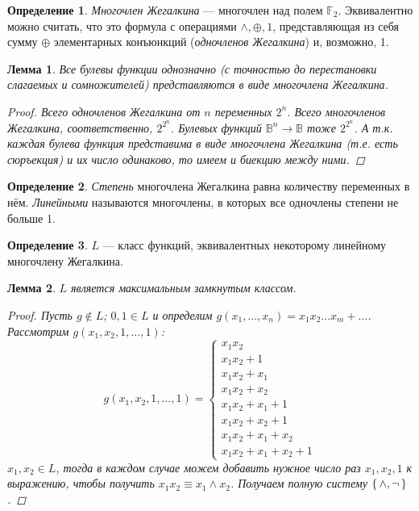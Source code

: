 \documentclass[12pt]{article}
\let\eq\equiv
\let\la\land
\let\n\neg
\let\nin\notin
\theoremstyle{definition}
\newtheorem{definition}{Определение}[section]
\theoremstyle{plain}
\newtheorem{lemma}{Лемма}[section]
\theoremstyle{remark}
\begin{document}
\begin{definition}
  \textit{Многочлен Жегалкина} --- многочлен над полем
  $\mathbb{F}_2$. Эквивалентно можно считать, что это формула с
  операциями $\la, \oplus, 1$, представляющая из себя сумму $\oplus$
  элементарных конъюнкций (\textit{одночленов Жегалкина}) и, возможно, 1.
\end{definition}

\begin{lemma}
  Все булевы функции однозначно (с точностью до перестановки
  слагаемых и сомножителей) представляются в виде многочлена Жегалкина.
  \begin{proof}
    Всего одночленов Жегалкина от $n$ переменных $2^n$. Всего
    многочленов Жегалкина, соответственно, $2^{2^n}$. Булевых функций
    $\mathbb{B}^n \to \mathbb{B}$ тоже $2^{2^n}$. А т.к. каждая
    булева функция представима в виде многочлена Жегалкина (т.е. есть
    сюръекция) и их число одинаково, то имеем и биекцию между ними.
  \end{proof}
\end{lemma}

\begin{definition}
  \textit{Степень} многочлена Жегалкина равна количеству переменных в
  нём. \textit{Линейными} называются многочлены, в которых все
  одночлены степени не больше 1.
\end{definition}

\begin{definition}
  $L$ --- класс функций, эквивалентных некоторому линейному
  многочлену Жегалкина.
\end{definition}

\begin{lemma}
  $L$ является максимальным замкнутым классом.
  \begin{proof}
    Пусть $g \nin L$; $0, 1 \in L$ и определим $g(x_1, \dots, x_n) =
    x_1x_2\dots x_m + \dots$. Рассмотрим $g(x_1, x_2, 1, \dots, 1)$:
    \[
      g(x_1, x_2, 1, \dots, 1) =
      \begin{cases}
        x_1x_2\\
        x_1x_2 + 1\\
        x_1x_2 + x_1\\
        x_1x_2 + x_2\\
        x_1x_2 + x_1 + 1\\
        x_1x_2 + x_2 + 1\\
        x_1x_2 + x_1 + x_2\\
        x_1x_2 + x_1 + x_2 + 1
      \end{cases}
    \]
    $x_1, x_2 \in L$, тогда в каждом случае можем добавить нужное
    число раз $x_1, x_2, 1$ к выражению, чтобы получить $x_1x_2 \eq
    x_1 \land x_2$. Получаем полную систему $\set{ \land, \n }$.
  \end{proof}
\end{lemma}
\end{document}
